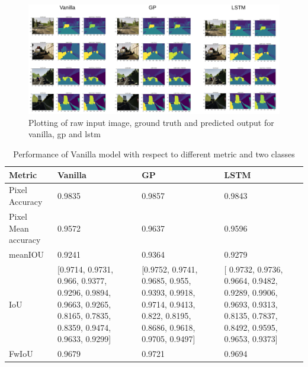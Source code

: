 	\begin{figure}[h]
		\centering
		\includegraphics[width=17cm]{images/unet_vkitti_two.png}
		\caption{Plotting of raw input image, ground truth and predicted output for vanilla, gp and lstm}
		\label{fig:vkitti_unet_two}
	\end{figure}

	\begin{table}
		\begin{center}
			\begin{tabular}{ | l | p{4cm} | p{4cm} | p{4cm} |}
				\hline
				
				\cellcolor{purple!30}Metric & \cellcolor{purple!30}Vanilla & \cellcolor{purple!30}GP & \cellcolor{purple!30}LSTM\\ \hline
				
				Pixel Accuracy & 0.9835 & 0.9857 & 0.9843 \\ \hline
				Pixel Mean accuracy & 0.9572 & 0.9637 & 0.9596 \\ \hline
				meanIOU & 0.9241 & 0.9364 & 0.9279 \\ \hline
				IoU & [0.9714, 0.9731, 0.966, 0.9377, 0.9296, 0.9894, 0.9663, 0.9265, 0.8165, 0.7835, 0.8359, 0.9474, 0.9633, 0.9299] & 
				[0.9752, 0.9741, 0.9685, 0.955, 0.9393, 0.9918, 0.9714, 0.9413, 0.822, 0.8195, 0.8686, 0.9618, 0.9705, 0.9497] 
				& [ 0.9732, 0.9736, 0.9664, 0.9482, 0.9289, 0.9906, 0.9693, 0.9313, 0.8135, 0.7837, 0.8492, 0.9595, 0.9653, 0.9373]
				\\ \hline
				FwIoU & 0.9679 & 0.9721 & 0.9694 \\ \hline
				\hline
			\end{tabular}
			\caption{Performance of Vanilla model with respect to different metric and two classes}
			\label{table:unet_vkitti_two_classes}
		\end{center}
	\end{table}
	
